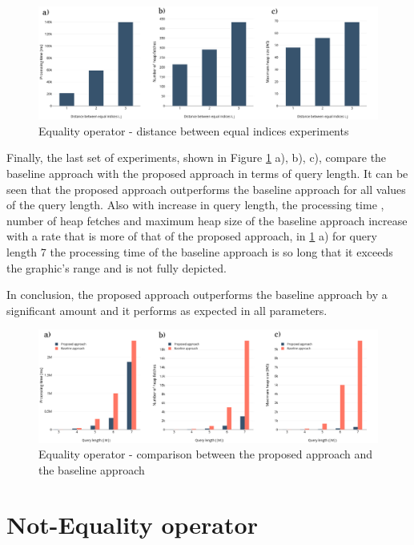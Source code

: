 \begin{figure}[H]
	\includegraphics[scale=0.3]{images/eo_distance.png}
	\centering
	\caption{Equality operator - distance between equal indices experiments}
	\label{fig:eo_distance}
\end{figure}

Finally, the last set of experiments, shown in Figure \ref{fig:eo_distance} a), b), c), compare the baseline approach with the proposed approach in terms of query length. It can be seen that the proposed approach outperforms the baseline approach for all values of the query length. Also with increase in query length, the processing time , number of heap fetches and maximum heap size of the baseline approach increase with a rate that is more of that of the proposed approach, in \ref{fig:eo_distance} a) for query length 7 the processing time of the baseline approach is so long that it exceeds the graphic's range and is not fully depicted.

In conclusion, the proposed approach outperforms the baseline approach by a significant amount and it performs as expected in all parameters.

\begin{figure}[H]
	\includegraphics[scale=0.3]{images/eo2_length.png}
	\centering
	\caption{Equality operator - comparison between the proposed approach and the baseline approach}
	\label{fig:eo2_length}
\end{figure}


\section{Not-Equality operator}
\label{sec:experimentsNEO}

